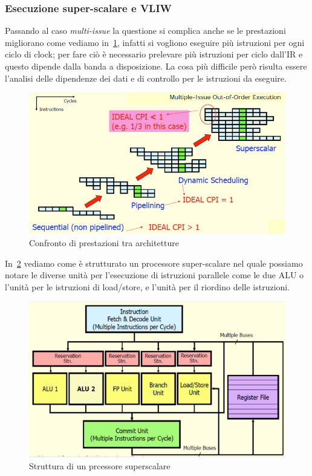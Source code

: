 \subsubsection{Esecuzione super-scalare e VLIW}
Passando al caso \emph{multi-issue} la questione si complica anche se le prestazioni migliorano come vediamo in \figurename\,\ref{fig:superscalar}, infatti si vogliono eseguire più istruzioni per ogni ciclo di clock; per fare ciò è necessario prelevare più istruzioni per ciclo dall'IR e questo dipende dalla banda a disposizione. La cosa più difficile però risulta essere l'analisi delle dipendenze dei dati e di controllo per le istruzioni da eseguire.
\begin{figure}[htb]
\centering
\includegraphics[scale=0.5]{img/superscalar.png}
\caption{Confronto di prestazioni tra architetture}\label{fig:superscalar}
\end{figure}
In \figurename\,\ref{fig:superstrut} vediamo come è strutturato un processore super-scalare nel quale possiamo notare le diverse unità per l'esecuzione di istruzioni parallele come le due ALU o l'unità per le istruzioni di load/store, e l'unità per il riordino delle istruzioni.\\
\begin{figure}[htb]
\centering
\includegraphics[scale=0.5]{img/superstrut.png}
\caption{Struttura di un prcessore superscalare}\label{fig:superstrut}
\end{figure}

